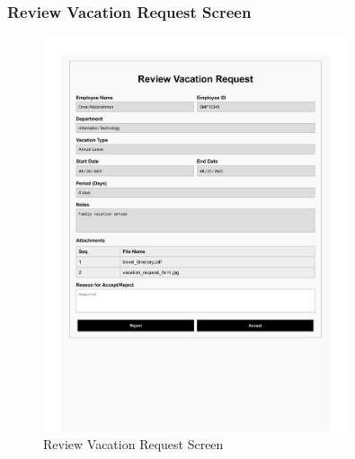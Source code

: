 \documentclass[12pt,a4paper]{article}
\begin{document}
\subsubsection{Review Vacation Request Screen}
\begin{figure}[H]
\centering
\includegraphics[width=0.8\textwidth]{Wireframes/Review-Vacation-Request/Review-Vacation-Request-1.png}
\caption{Review Vacation Request Screen}
\label{fig:review-vacation-screen}
\end{figure}
\end{document}
